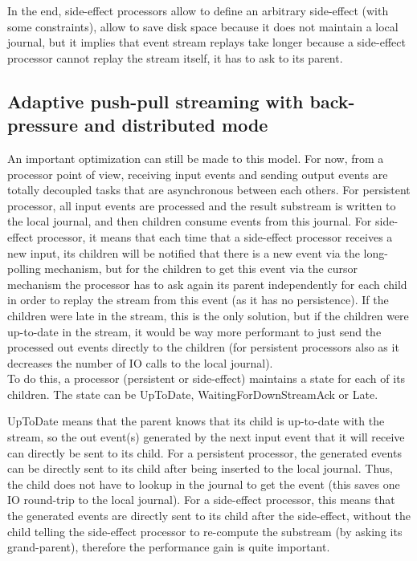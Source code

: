 In the end, side-effect processors allow to define an arbitrary side-effect (with some constraints), allow to save disk space because it does not maintain
a local journal, but it implies that event stream replays take longer because a side-effect processor cannot replay the stream itself, it has to ask to its parent.


\subsection{Adaptive push-pull streaming with back-pressure and distributed mode}
\label{sec:adapativepushpull}

An important optimization can still be made to this model. For now, from a processor point of view, receiving input events and sending output events are totally
decoupled tasks that are asynchronous between each others. For persistent processor, all input events are processed and the result substream is written to the local journal, and then children consume events from this journal. For side-effect processor, it means that each time that a side-effect processor receives a new input, its children will be notified that there is a new event via the long-polling mechanism, but for the children to get this event via the cursor mechanism the processor has to ask again its parent independently for each child in order to replay the stream from this event (as it has no persistence). 
If the children were late in the stream, this is the only solution, but if the children were up-to-date in the stream, it would be way more performant to just send the processed out events directly to the children (for persistent processors also as it decreases the number of IO calls to the local journal).
\\

To do this, a processor (persistent or side-effect) maintains a state for each of its children. The state can be UpToDate, WaitingForDownStreamAck or Late.

UpToDate means that the parent knows that its child is up-to-date with the stream, so the out event(s) generated by the next input event that it will receive can 
directly be sent to its child. For a persistent processor, the generated events can be directly sent to its child after being inserted to the local journal. Thus,
the child does not have to lookup in the journal to get the event (this saves one IO round-trip to the local journal). For a side-effect processor, this means
that the generated events are directly sent to its child after the side-effect, without the child telling the side-effect processor to re-compute the substream (by asking its grand-parent), therefore the performance gain is quite important.


